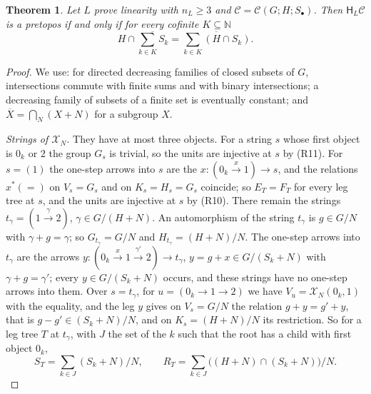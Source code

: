 \documentclass[11pt]{amsart}
\newtheorem{thm}{Theorem}[section]
\theoremstyle{definition}
\newcommand{\HH}{\mathsf H}
\newcommand{\cX}{\mathcal X}
\newcommand{\cC}{\mathcal C}
\begin{document}
\begin{thm}\label{thm:collapse}
Let $L$ prove linearity with $n_L\ge3$ and $\cC=\cC(G;H;S_\bullet)$.
Then $\HH_L\cC$ is a pretopos if and only if for every cofinite
$K\subseteq\mathbb N$
\begin{equation}\label{eq:cof}
H\cap\overline{\sum_{k\in K}S_k}=\overline{\sum_{k\in K}(H\cap S_k)}.
\end{equation}
\end{thm}
\begin{proof}
We use: for directed decreasing families of closed subsets of $G$,
intersections commute with finite sums and with binary intersections;
a decreasing family of subsets of a finite set is eventually constant;
and $\overline X=\bigcap_N(X+N)$ for a subgroup $X$.

\emph{Strings of $\cX_N$.} They have at most three objects. For a
string $s$ whose first object is $0_k$ or $2$ the group $G_s$ is
trivial, so the units are injective at $s$ by (R11). For $s=(1)$ the
one-step arrows into $s$ are the $x\colon(0_k\xrightarrow{x}1)\to s$,
and the relations $x^*(=)$ on $V_s=G_s$ and on $K_s=H_s=G_s$ coincide;
so $E_T=F_T$ for every leg tree at $s$, and the units are injective at
$s$ by (R10). There remain the strings
$t_\gamma=(1\xrightarrow{\gamma}2)$, $\gamma\in G/(H+N)$. An
automorphism of the string $t_\gamma$ is $g\in G/N$ with $\gamma+g=
\gamma$; so $G_{t_\gamma}=G/N$ and $H_{t_\gamma}=(H+N)/N$. The
one-step arrows into $t_\gamma$ are the arrows $y\colon(0_k
\xrightarrow{x}1\xrightarrow{\gamma'}2)\to t_\gamma$, $y=g+x\in
G/(S_k+N)$ with $\gamma+g=\gamma'$; every $y\in G/(S_k+N)$ occurs, and
these strings have no one-step arrows into them. Over $s=t_\gamma$,
for $u=(0_k\to1\to2)$ we have $V_u=\cX_N(0_k,1)$ with the equality,
and the leg $y$ gives on $V_s=G/N$ the relation $g+y=g'+y$, that is
$g-g'\in(S_k+N)/N$, and on $K_s=(H+N)/N$ its restriction. So for a leg
tree $T$ at $t_\gamma$, with $J$ the set of the $k$ such that the root
has a child with first object $0_k$,
\begin{equation}\label{eq:SR}
S_T=\sum_{k\in J}(S_k+N)/N,\qquad R_T=\sum_{k\in J}\bigl((H+N)\cap
(S_k+N)\bigr)/N.
\end{equation}


\end{proof}
\end{document}
